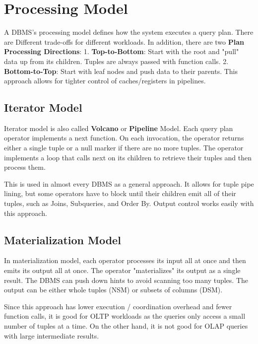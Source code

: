 \documentclass[11pt]{article}
\begin{document}
\section{Processing Model}
A DBMS's processing model defines how the system executes a query plan. There are Different 
trade-offs for different workloads. In addition, there are two \textbf{Plan Processing Directions}: 
1. \textbf{Top-to-Bottom}: Start with the root and "pull" data up from its children. Tuples are 
always passed with function calls. 2. \textbf{Bottom-to-Top}: Start with leaf nodes and push data to 
their parents. This approach allows for tighter control of caches/registers in pipelines.

\subsection*{Iterator Model}
Iterator model is also called \textbf{Volcano} or \textbf{Pipeline} Model. Each query plan operator 
implements a next function. On each invocation, the operator returns either a single tuple or a null 
marker if there are no more tuples. The operator implements a loop that calls next on its children to 
retrieve their tuples and then process them.

This is used in almost every DBMS as a general approach. It allows for tuple pipe lining, but some 
operators have to block until their children emit all of their tuples, such as Joins, Subqueries, and 
Order By. Output control works easily with this approach.

\subsection*{Materialization Model}
In materialization model, each operator processes its input all at once and then emits its output all 
at once. The operator "materializes" its output as a single result. The DBMS can push down hints to 
avoid scanning too many tuples. The output can be either whole tuples (NSM) or subsets of columns 
(DSM). 

Since this approach has lower execution / coordination overhead and fewer function calls, it is good 
for OLTP workloads as the  queries only access a small number of tuples at a time. On the other hand, 
it is not good for OLAP queries with large intermediate results.
\end{document}
